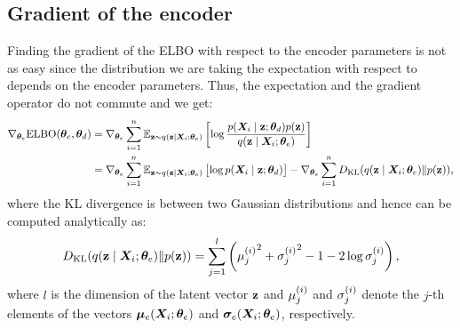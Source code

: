 \subsection{Gradient of the encoder}
\label{sec:vae_encoder_grad}
Finding the gradient of the ELBO with respect to the encoder parameters is not as easy since the distribution we are taking the expectation with respect to depends on the encoder parameters. Thus, the expectation and the gradient operator do not commute and we get:
\begin{align}
    \nabla_{{\bm{\theta}}_e} \mathrm{ELBO}({\bm{\theta}}_e, {\bm{\theta}}_d) &= \nabla_{{\bm{\theta}}_e} \sum_{i=1}^n \mathbb{E}_{{\mathbf{z}} \sim q({\mathbf{z}} \mid {\bm{X}}_i; {\bm{\theta}}_e)} \left[\log \frac{p({\bm{X}}_i \mid {\mathbf{z}}; {\bm{\theta}}_d)p({\mathbf{z}})}{q({\mathbf{z}} \mid {\bm{X}}_i; {\bm{\theta}}_e)} \right] \nonumber\\
    &= \nabla_{{\bm{\theta}}_e} \sum_{i=1}^n \mathbb{E}_{{\mathbf{z}} \sim q({\mathbf{z}} \mid {\bm{X}}_i; {\bm{\theta}}_e)} \left[\log p({\bm{X}}_i \mid {\mathbf{z}}; {\bm{\theta}}_d) \right] - \nabla_{{\bm{\theta}}_e} \sum_{i=1}^n D_{\mathrm{KL}}(q({\mathbf{z}} \mid {\bm{X}}_i; {\bm{\theta}}_e) \Vert p({\mathbf{z}})) \label{eq:vae_encoder_grad},
\end{align}
where the KL divergence is between two Gaussian distributions and hence can be computed analytically as:
\begin{equation}
    \label{eq:vae_kl}
    D_{\mathrm{KL}}(q({\mathbf{z}} \mid {\bm{X}}_i; {\bm{\theta}}_e) \Vert p({\mathbf{z}})) = \sum_{j=1}^l \left({{\mu}_j^{(i)}}^2 + {{\sigma}_j^{(i)}}^2 -1 -2\log {{\sigma}_j^{(i)}}\right),
\end{equation}
where $l$ is the dimension of the latent vector ${\mathbf{z}}$ and ${\mu}_j^{(i)}$ and ${\sigma}_j^{(i)}$ denote the $j$-th elements of the vectors ${\bm{\mu}}_e({\bm{X}}_i; {\bm{\theta}}_e)$ and ${\bm{\sigma}}_e({\bm{X}}_i; {\bm{\theta}}_e)$, respectively.

